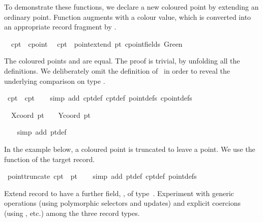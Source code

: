 \begin{isabellebody}
\begin{isamarkuptext}
  To demonstrate these functions, we declare a new coloured point by
  extending an ordinary point.  Function  augments
   with a colour value, which is converted into an
  appropriate record fragment by .%
\end{isamarkuptext}%
\isamarkuptrue%
\isanewline
\ \ cpt{}\ {\isacharcolon}{\isacharcolon}\ cpoint\isanewline
\ \ {\isachardoublequote}cpt{}\ {\isasymequiv}\ point{\isachardot}extend\ pt{}\ {\isacharparenleft}cpoint{\isachardot}fields\ Green{\isacharparenright}{\isachardoublequote}\isamarkupfalse%
%
\begin{isamarkuptext}%
The coloured points  and  are equal.  The
  proof is trivial, by unfolding all the definitions.  We deliberately
  omit the definition of~ in order to reveal the underlying
  comparison on type .%
\end{isamarkuptext}%
\isamarkuptrue%
\ {\isachardoublequote}cpt{}\ {\isacharequal}\ cpt{}{\isachardoublequote}\isanewline
\ \ \isamarkupfalse%
\ {\isacharparenleft}simp\ add{\isacharcolon}\ cpt{}{\isacharunderscore}def\ cpt{}{\isacharunderscore}def\ point{\isachardot}defs\ cpoint{\isachardot}defs{\isacharparenright}\isamarkupfalse%
%
\begin{isamarkuptxt}%
\begin{isabelle}%
\ {}{\isachardot}\ Xcoord\ pt{}\ {\isacharequal}\ {}{}{}\ {\isasymand}\ Ycoord\ pt{}\ {\isacharequal}\ {}{}%
\end{isabelle}%
\end{isamarkuptxt}%
\ \ \isamarkuptrue%
\ {\isacharparenleft}simp\ add{\isacharcolon}\ pt{}{\isacharunderscore}def{\isacharparenright}\isanewline
\ \ \isamarkupfalse%
\isamarkupfalse%
%
\begin{isamarkuptext}%
In the example below, a coloured point is truncated to leave a
  point.  We use the  function of the target record.%
\end{isamarkuptext}%
\isamarkuptrue%
\ {\isachardoublequote}point{\isachardot}truncate\ cpt{}\ {\isacharequal}\ pt{}{\isachardoublequote}\isanewline
\ \ \isamarkupfalse%
\ {\isacharparenleft}simp\ add{\isacharcolon}\ pt{}{\isacharunderscore}def\ cpt{}{\isacharunderscore}def\ point{\isachardot}defs{\isacharparenright}\isamarkupfalse%
%
\begin{isamarkuptext}%
\begin{exercise}
  Extend record  to have a further field, , of type~.  Experiment with generic operations
  (using polymorphic selectors and updates) and explicit coercions
  (using ,  etc.) among the three record
  types.
  \end{exercise}


\end{isamarkuptext}
\end{isabellebody}
